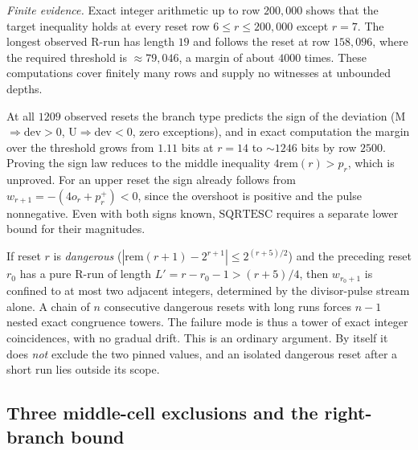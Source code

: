 \emph{Finite evidence.} Exact integer arithmetic up to row $200{,}000$ shows that the
target inequality holds at every reset row $6\le r\le200{,}000$ except $r=7$. The longest observed R-run has length $19$ and follows
the reset at row $158{,}096$, where the required threshold is $\approx79{,}046$, a margin of about
$4000$ times.  These computations cover finitely many rows and supply no witnesses at unbounded depths.

\begin{obs}
At all $1209$ observed resets the branch type predicts the sign of the deviation
(M$\Rightarrow$dev$>0$, U$\Rightarrow$dev$<0$, zero exceptions), and in exact computation the margin over the threshold
grows from $1.11$ bits at $r=14$ to $\sim1246$ bits by row $2500$. Proving the sign
law reduces to the middle inequality
$4\mathrm{rem}(r)>p_r$, which is unproved.  For an upper reset the sign already follows
from $w_{r+1}=-(4o_r+p_r^+)<0$, since the overshoot is positive and the
pulse nonnegative.
Even with both signs known, $\mathrm{SQRTESC}$ requires a separate lower bound for their
magnitudes.
\end{obs}

\begin{obs}
\label{obs:dangerous-reset-rigidity}
If reset $r$ is \emph{dangerous} ($|\mathrm{rem}(r+1)-2^{r+1}|\le2^{(r+5)/2}$) and the preceding
reset $r_0$ has a pure R-run of length $L'=r-r_0-1>(r+5)/4$, then $w_{r_0+1}$ is confined to at
most two adjacent integers, determined by the divisor-pulse stream alone. A chain of $n$
consecutive dangerous resets with long runs forces $n-1$ nested exact congruence towers. The
failure mode is thus a tower of exact integer coincidences, with no gradual drift. This is an ordinary
argument. By itself it does \emph{not} exclude the two pinned values, and an isolated dangerous reset after a
short run lies outside its scope.
\end{obs}

\subsection{Three middle-cell exclusions and the right-branch bound}

